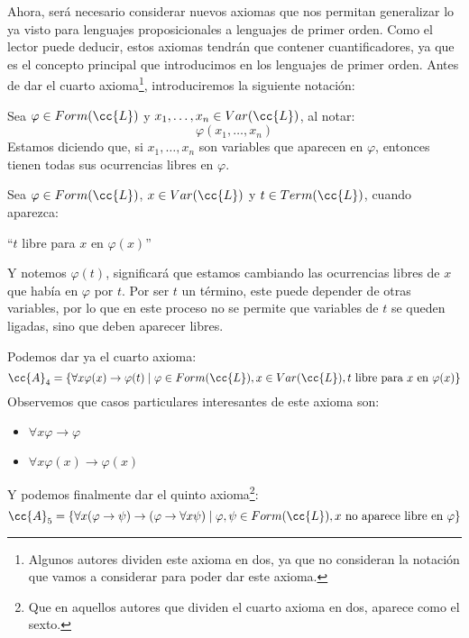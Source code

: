 Ahora, será necesario considerar nuevos axiomas que nos permitan generalizar lo ya visto para lenguajes proposicionales a lenguajes de primer orden. Como el lector puede deducir, estos axiomas tendrán que contener cuantificadores, ya que es el concepto principal que introducimos en los lenguajes de primer orden. Antes de dar el cuarto axioma\footnote{Algunos autores dividen este axioma en dos, ya que no consideran la notación que vamos a considerar para poder dar este axioma.}, introduciremos la siguiente notación:

\begin{notacion}
    Sea $\varphi \in Form(\cc{L})$ y $x_1,\ldots,x_n \in Var(\cc{L})$, al notar:
    \begin{equation*}
        \varphi(x_1,\ldots,x_n)
    \end{equation*}
    Estamos diciendo que, si $x_1,\ldots,x_n$ son variables que aparecen en $\varphi$, entonces tienen todas sus ocurrencias libres en $\varphi$.
\end{notacion}

\begin{notacion}
    Sea $\varphi \in Form(\cc{L})$, $x\in Var(\cc{L})$ y $t\in Term(\cc{L})$, cuando aparezca:
    \begin{center}
        ``$t$ libre para $x$ en $\varphi(x)$''
    \end{center}
    Y notemos $\varphi(t)$, significará que estamos cambiando las ocurrencias libres de $x$ que había en $\varphi$ por $t$. Por ser $t$ un término, este puede depender de otras variables, por lo que en este proceso no se permite que variables de $t$ se queden ligadas, sino que deben aparecer libres.
\end{notacion}
Podemos dar ya el cuarto axioma:
\begin{equation*}
    \cc{A}_4 = \{\forall x\varphi(x)\to\varphi(t) \mid \varphi \in Form(\cc{L}), x\in Var(\cc{L}), t \text{\ libre para\ } x \text{\ en\ } \varphi(x)\}
\end{equation*}
Observemos que casos particulares interesantes de este axioma son:
\begin{itemize}
    \item $\forall x\varphi \to \varphi$
    \item $\forall x\varphi(x)\to \varphi(x)$
\end{itemize}

Y podemos finalmente dar el quinto axioma\footnote{Que en aquellos autores que dividen el cuarto axioma en dos, aparece como el sexto.}:
\begin{equation*}
    \cc{A}_5 = \{\forall x(\varphi\to\psi)\to(\varphi\to\forall x\psi) \mid \varphi,\psi \in Form(\cc{L}), x \text{\ no aparece libre en\ } \varphi\}
\end{equation*}

